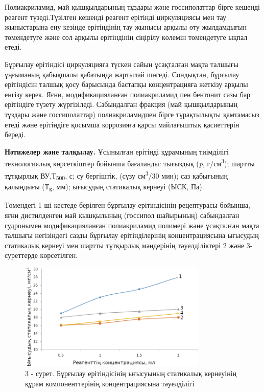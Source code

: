 \begin{multicols}{2}
Полиакриламид, май қышқылдарының тұздары және госсиполаттар бірге
кешенді реагент түзеді.Түзілген кешенді реагент ерітінді циркуляциясы
мен тау жыныстарына ену кезінде ерітіндінің тау жынысы арқылы өту
жылдамдығын төмендетуге және сол арқылы ерітіндінің сіңірілу көлемін
төмендетуге ықпал етеді.

Бұрғылау ерітіндісі циркуляцияға түскен сайын ұсақталған мақта талшығы
ұңғыманың қабықшалы қабатында жартылай шөгеді. Сондықтан, бұрғылау
ерітіндісін талшық қосу барысында бастапқы концентрацияға жеткізу арқылы
енгізу керек. Яғни, модификацияланған полиакриламид пен бентонит сазы
бар ерітіндіге түзету жүргізіледі. Сабындалған фракция (май
қышқылдарының тұздары және госсиполаттар) полиакриламидпен бірге
тұрақтылықты қамтамасыз етеді және ерітіндіге қосымша коррозияға қарсы
майлағыштық қасиеттерін береді.

{\bfseries Нәтижелер және талқылау.} Ұсынылған ерітінді құрамының
тиімділігі технологиялық көрсеткіштер бойынша бағаланды: тығыздық
(\emph{p}, г/см\textsuperscript{3}); шартты тұтқырлық
ВУ,Т\textsubscript{500}, с; су бергіштік, (сүзу см\textsuperscript{3}/30
мин); саз қабығының қалыңдығы (Т\textsubscript{к}, мм); ығысудың
статикалық кернеуі (ЫСК, Па).

Төмендегі 1-ші кестеде берілген бұрғылау ерітіндісінің рецептурасы
бойынша, яғни дистилденген май қышқылының (госсипол шайырының)
сабындалған гудронымен модификацияланған полиакриламид полимері және
ұсақталған мақта талшығы негізіндегі сазды бұрғылау ерітінділерінің
концентрациясына ығысудың статикалық кернеуі мен шартты тұтқырлық
мәндерінің тәуелділіктері 2 және 3-суреттерде көрсетілген.
\end{multicols}




\begin{figure}[H]
	\centering
	\includegraphics[width=0.8\textwidth]{media/gorn/image46}
    \caption*{3 - сурет. Бұрғылау ерітіндісінің ығысуының статикалық кернеуінің құрам компоненттерінің концентрациясына тәуелділігі}
\end{figure}

